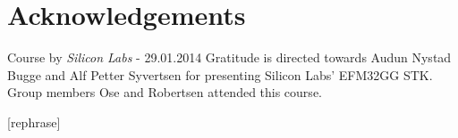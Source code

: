 \chapter{Acknowledgements}
Course by \textit{Silicon Labs} - 29.01.2014
Gratitude is directed towards Audun Nystad Bugge and Alf Petter Syvertsen for presenting Silicon Labs' EFM32GG STK. Group members Ose and Robertsen attended this course.

[rephrase]